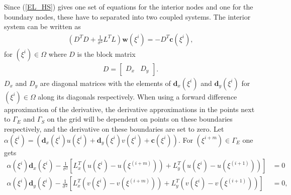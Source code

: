 Since (\ref{EL_HS}) gives one set of equations for the interior nodes and one for the boundary nodes, these have to separated into two coupled systems. The interior system can be written as
\begin{align}
(D^T D + \frac{1}{\sigma^2} L^TL) \textbf{w}(\xi^i) = - D^T \textbf{c}(\xi^i),
\end{align}
for $(\xi^i) \in \Omega$ where $D$ is the block matrix
\begin{align*}
D = \left[
\begin{array}{c|c}
D_x & D_y
\end{array}
\right].
\end{align*}
$D_x$ and $D_y$ are diagonal matrices with the elements of $\textbf{d}_x(\xi^i)$ and $\textbf{d}_y(\xi^i)$ for $(\xi^i) \in \Omega$ along its diagonals respectively. When using a forward difference approximation of the derivative, the derivative approximations in the points next to $\Gamma_E$ and $\Gamma_S$ on the grid will be dependent on points on these boundaries respectively, and the derivative on these boundaries are set to zero. Let $\alpha(\xi^i) = (\textbf{d}_x(\xi^i) u(\xi^i) + \textbf{d}_y(\xi^i) v(\xi^i) + \textbf{c}(\xi^i))$. For $(\xi^{i+m}) \in \Gamma_E$ one gets 
\begin{align*}
\alpha(\xi^i) \textbf{d}_x(\xi^i) - \frac{1}{\sigma^2}\left[ L_x^T \left(u(\xi^i)-u(\xi^{(i+m)}) \right) + L_y^T \left( u(\xi^i)-u(\xi^{(i+1)}) \right) \right] &= 0 \\
\alpha(\xi^i) \textbf{d}_y(\xi^i) - \frac{1}{\sigma^2} \left[ L_x^T \left( v(\xi^i)-v(\xi^{(i+m)}) \right) + L_y^T \left( v(\xi^i)-v(\xi^{(i+1)}) \right) \right] &= 0,
\end{align*}
